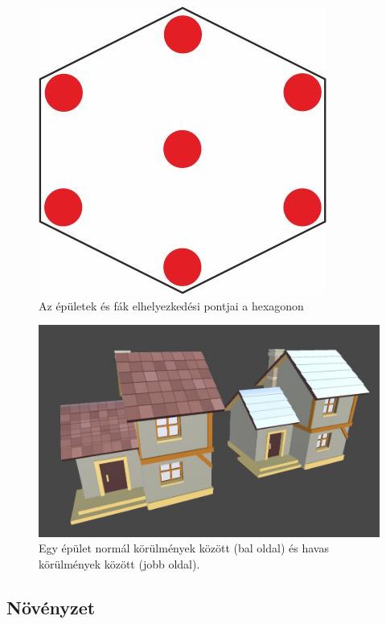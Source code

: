 \begin{figure}[h!]
\centering
\includegraphics[scale=1]{kepek/Places.jpg}
\caption{Az épületek és fák elhelyezkedési pontjai a hexagonon}
\label{fig:Places}
\end{figure}

\begin{figure}[h!]
\centering
\includegraphics[scale=0.3]{kepek/Buildings.JPG}
\caption[épület]{Egy épület normál körülmények között (bal oldal) és havas körülmények között (jobb oldal). \footnotemark}
\label{fig:Buildings}
\end{figure}


\subsection{Növényzet}


